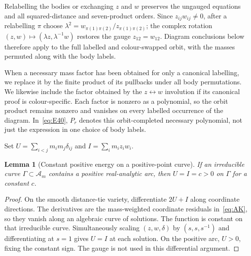 \documentclass[11pt]{amsart}
\newtheorem{lemma}[theorem]{Lemma}
\theoremstyle{remark}
\newcommand{\A}{\mathcal A}
\begin{document}
Relabelling the bodies or exchanging $z$ and $w$ preserves the ungauged equations and all squared-distance and seven-product orders. Since $z_{ij}w_{ij}\ne0$, after a relabelling $\pi$ choose $\lambda^2=w_{\pi(1)\pi(2)}/z_{\pi(1)\pi(2)}$; the complex rotation $(z,w)\mapsto(\lambda z,\lambda^{-1}w)$ restores the gauge $z_{12}=w_{12}$. Diagram conclusions below therefore apply to the full labelled and colour-swapped orbit, with the masses permuted along with the body labels.

When a necessary mass factor has been obtained for only a canonical labelling, we replace it by the finite product of its pullbacks under all body permutations. We likewise include the factor obtained by the $z\leftrightarrow w$ involution if its canonical proof is colour-specific. Each factor is nonzero as a polynomial, so the orbit product remains nonzero and vanishes on every labelled occurrence of the diagram. In~\eqref{eq:E40}, $P_r$ denotes this orbit-completed necessary polynomial, not just the expression in one choice of body labels.

Set $U=\sum_{i<j}m_im_j\delta_{ij}$ and $I=\sum_i m_iz_iw_i$.
\begin{lemma}[Constant positive energy on a positive-point curve]\label{lem:energy}
If an irreducible curve $\Gamma\subset\A_m$ contains a positive real-analytic arc, then $U=I=c>0$ on $\Gamma$ for a constant $c$.
\end{lemma}
\begin{proof}
On the smooth distance-tie variety, differentiate $2U+I$ along coordinate directions. The derivatives are the mass-weighted coordinate residuals in~\eqref{eq:AK}, so they vanish along an algebraic curve of solutions. The function is constant on that irreducible curve. Simultaneously scaling $(z,w,\delta)$ by $(s,s,s^{-1})$ and differentiating at $s=1$ gives $U=I$ at each solution. On the positive arc, $U>0$, fixing the constant sign. The gauge is not used in this differential argument.
\end{proof}
\end{document}
